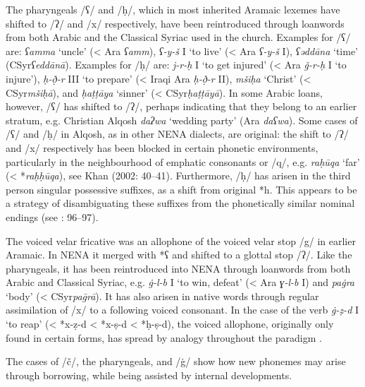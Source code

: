 \documentclass[output=paper]{langsci/langscibook}
\begin{document}
The pharyngeals /ʕ/ and /ḥ/, which in most inherited Aramaic lexemes have shifted to /ʔ/ and /x/ respectively, have been reintroduced through loanwords from both Arabic and the Classical Syriac used in the church. Examples for /ʕ/ are: \textit{ʕamma} ‘uncle’ (< Ara \textit{ʕamm}), \textit{ʕ\nobreakdash-y\nobreakdash-š} I ‘to live’ (< Ara \textit{ʕ\nobreakdash-y\nobreakdash-š} I), \textit{ʕəddāna} ‘time’ (CSyr\textit{ʕeddānā}). Examples for /ḥ/ are: \textit{j\nobreakdash-r\nobreakdash-ḥ} I ‘to get injured’ (< Ara \textit{ǧ\nobreakdash-r\nobreakdash-ḥ} I ‘to injure’), \textit{ḥ\nobreakdash-ð̣\nobreakdash-r} III ‘to prepare’ (< Iraqi Ara \textit{ḥ\nobreakdash-ð̣\nobreakdash-r} II), \textit{mšiḥa} ‘Christ’ (< CSyr\textit{mšiḥā}), and \textit{ḥaṭṭāya} ‘sinner’ (< CSyr\textit{ḥaṭṭāyā}). In some Arabic loans, however, /ʕ/ has shifted to /ʔ/, perhaps indicating that they belong to an earlier stratum, e.g. Christian Alqosh \textit{daʔwa} ‘wedding party’ (Ara \textit{daʕwa}). Some cases of /ʕ/ and /ḥ/ in Alqosh, as in other NENA dialects, are original: the shift to /ʔ/ and /x/ respectively has been blocked in certain phonetic environments, particularly in the neighbourhood of emphatic consonants or /q/, e.g. \textit{raḥūqa} ‘far’ (< *\textit{raḥḥūqa}), see Khan (2002: 40–41). Furthermore, /ḥ/ has arisen in the third person singular possessive suffixes, as a shift from original *h. This appears to be a strategy of disambiguating these suffixes from the phonetically similar nominal endings (see \citealt{Coghill2008}: 96–97).

The voiced velar fricative was an allophone of the voiced velar stop /g/ in earlier Aramaic. In NENA it merged with *ʕ and shifted to a glottal stop /ʔ/. Like the pharyngeals, it has been reintroduced into NENA through loanwords from both Arabic and Classical Syriac, e.g. \textit{\.g\nobreakdash-l\nobreakdash-b} I ‘to win, defeat’ (< Ara \textit{ɣ\nobreakdash-l\nobreakdash-b} I) and \textit{pa\.gra} ‘body’ (< CSyr\textit{pa\={g}rā}). It has also arisen in native words through regular assimilation of /x/ to a following voiced consonant. In the case of the verb \textit{\.g\nobreakdash-ẓ\nobreakdash-d} I ‘to reap’ (< *x\nobreakdash-ẓ\nobreakdash-d < *x\nobreakdash-ṣ\nobreakdash-d  < *ḥ\nobreakdash-ṣ\nobreakdash-d), the voiced allophone, originally only found in certain forms, has spread by analogy throughout the paradigm \citep[20]{Coghill2004}.

The cases of /č/, the pharyngeals, and /\.g/ show how new phonemes may arise through borrowing, while being assisted by internal developments.
\end{document}
